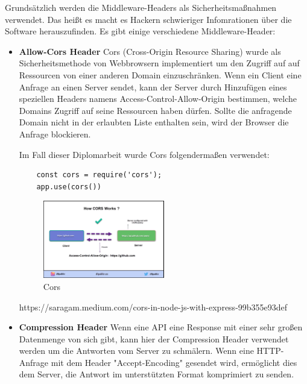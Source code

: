 Grundsätzlich werden die Middleware-Headers als Sicherheitsmaßnahmen verwendet. Das heißt es macht es Hackern schwieriger Infomrationen über die Software herauszufinden. Es gibt einige verschiedene Middleware-Header:

\begin{itemize}
    \item \textbf{Allow-Cors Header}
        \newline
        Cors (Cross-Origin Resource Sharing) wurde als Sicherheitsmethode von Webbrowsern implementiert um den Zugriff auf auf Ressourcen von einer anderen Domain einzuschränken. Wenn ein Client eine Anfrage an einen Server sendet, kann der Server durch Hinzufügen eines speziellen Headers namens Access-Control-Allow-Origin bestimmen, welche Domains Zugriff auf seine Ressourcen haben dürfen. Sollte die anfragende Domain nicht in der erlaubten Liste enthalten sein, wird der Browser die Anfrage blockieren.

        Im Fall dieser Diplomarbeit wurde Cors folgendermaßen verwendet:

\begin{lstlisting}
    const cors = require('cors');
    app.use(cors())
\end{lstlisting}
                
\begin{figure}[h]
    \centering
    \includegraphics[width=0.5\textwidth]{pics/cors.png}
    \caption{Cors}
    \label{fig:mesh1}
\end{figure}

        \cite{Cors}
        https://saragam.medium.com/cors-in-node-js-with-express-99b355e93def
    \item \textbf{Compression Header}
        \newline
        Wenn eine API eine Response mit einer sehr großen Datenmenge von sich gibt, kann hier der Compression Header verwendet werden um die Antworten vom Server zu schmälern. Wenn eine HTTP-Anfrage mit dem Header "Accept-Encoding" gesendet wird, ermöglicht dies dem Server, die Antwort im unterstützten Format komprimiert zu senden.


\end{itemize}
